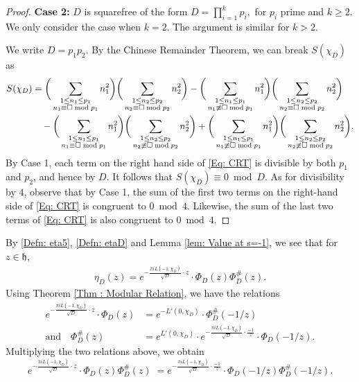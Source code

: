 \documentclass[11pt]{amsart}
\numberwithin{equation}{section}
\theoremstyle{remark}
\begin{document}
\begin{proof}
\noindent \textbf{Case 2:}  $D$ is squarefree of the form $D = \prod_{i=1}^{k}p_i,$ for $p_i$ prime and $k \geq 2$. We only consider the case when $k=2$. The argument is similar for $k>2$.
\par
We write $D=p_1p_2$. By the Chinese Remainder Theorem, we can break $S({\chi_{D}})$ as
\begin{align}\label{Eq: CRT}
S({\chi_{D}}) &= \bigg ( \sum_{\substack{1 \leq n_1 \leq p_1 \\ n_1 \equiv \square \bmod p_1}} n_1^2 \bigg) \bigg( \sum_{\substack{1 \leq n_2 \leq p_2 \\ n_2 \equiv \square \bmod p_2}} n_2^2 \bigg) -  \bigg ( \sum_{\substack{1 \leq n_1 \leq p_1 \\ n_1 \not\equiv \square \bmod p_1}} n_1^2 \bigg) \bigg( \sum_{\substack{1 \leq n_2 \leq p_2 \\ n_2 \equiv \square \bmod p_2}} n_2^2 \bigg) \notag \\
&\quad - \bigg ( \sum_{\substack{1 \leq n_1 \leq p_1 \\ n_1 \equiv \square \bmod p_1}} n_1^2 \bigg) \bigg( \sum_{\substack{1 \leq n_2 \leq p_2 \\ n_2 \not \equiv \square \bmod p_2}} n_2^2 \bigg)+ \bigg ( \sum_{\substack{1 \leq n_1 \leq p_1 \\ n_1 \not \equiv \square \bmod p_1}} n_1^2 \bigg) \bigg( \sum_{\substack{1 \leq n_2 \leq p_2 \\ n_2 \not \equiv \square \bmod p_2}} n_2^2 \bigg).
\end{align} 
By Case 1, each term on the right hand side of \eqref{Eq: CRT} is divisible by both $p_1$ and $p_2$, and hence by $D$. It follows that $S({\chi_{D}}) \equiv 0 \bmod D$. As for divisibility by $4$, observe that by Case 1, the sum of the first two terms on the right-hand side of \eqref{Eq: CRT} is congruent to $0 \bmod 4$. Likewise, the sum of the last two terms of \eqref{Eq: CRT} is also congruent to $0 \bmod 4$.
\end{proof}

By \eqref{Defn: eta5}, \eqref{Defn: etaD} and Lemma \ref{lem: Value at s=-1}, we see that for $z \in \mathfrak{h}$,
\begin{align}\label{Eta_q definition rewritten}
\eta_{D}(z) =e^{-\frac{\pi i L(-1,{\chi_D})}{\sqrt{D}}\cdot z} \cdot \Phi_{D}(z) \Phi_{D}^\#(z).
\end{align} 
Using Theorem \ref{Thm : Modular Relation}, we have the relations
\begin{align}
    e^{-\frac{\pi i L(-1,{\chi_D})}{\sqrt{D}}\cdot z} \cdot  \Phi_{D}(z) &=e^{-L'(0,{\chi_{D}})} \cdot \Phi^\#_{D}(-1/z) \\
\textrm{and} \quad \Phi_{D}^\#(z) &=e^ {L'(0,{\chi_{D}})} \cdot e^{-\frac{\pi i L(-1,{\chi_D})}{\sqrt{D}}\cdot\frac{-1}{z}} \cdot \Phi_{D}(-1/z).
\end{align}
Multiplying the two relations above, we obtain
\begin{equation} \label{ModularRelation General} 
e^{-\frac{\pi i L(-1,{\chi_D})}{\sqrt{D}}\cdot z} \cdot \Phi_{D}(z) \Phi_{D}^\#(z)\; = e^{-\frac{\pi i L(-1,{\chi_D})}{\sqrt{D}}\cdot\frac{-1}{z}} 
 \cdot \Phi_{D}(-1/z) \Phi^\#_{D}(-1/z).  
\end{equation}
\end{document}
